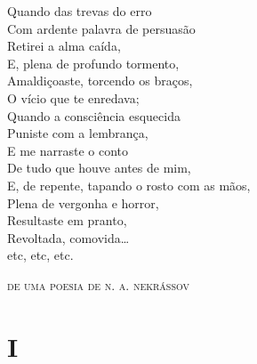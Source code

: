 \epigraph{Quando das trevas do erro\\
Com ardente palavra de persuasão\\
Retirei a alma caída,\\
E, plena de profundo tormento,\\
Amaldiçoaste, torcendo os braços,\\
O vício que te enredava;\\
Quando a consciência esquecida\\
Puniste com a lembrança,\\
E me narraste o conto\\
De tudo que houve antes de mim,\\
E, de repente, tapando o rosto com as mãos,\\
Plena de vergonha e horror,\\
Resultaste em pranto,\\
Revoltada, comovida\ldots{}\\
etc, etc, etc.}{\textsc{de uma poesia de n. a. nekrássov}\footnotemark}

\section{I}

